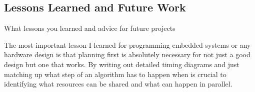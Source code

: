 \subsection{Lessons Learned and Future Work}
What lessons you learned and advice for future projects

The most important lesson I learned for programming embedded systems or any hardware design 
is that planning first is absolutely necessary for not just a good design but one that works. 
By writing out detailed timing diagrams and just matching up what step of an algorithm has to 
happen when is crucial to identifying what resources can be shared and what can happen in 
parallel. 

